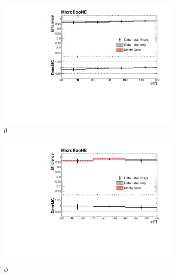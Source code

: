 \documentclass[a4paper,11pt]{article}
\begin{document}
\begin{figure}[htbp]
  \begin{center}
    \begin{subfigure}{0.61\textwidth}
      \includegraphics[width=\linewidth]{figures/theta.pdf}
      \caption{$\theta$} \label{fig:theta}
    \end{subfigure}
    \begin{subfigure}{0.61\textwidth}
      \includegraphics[width=\linewidth]{figures/phi.pdf}
      \caption{$\phi$} \label{fig:phi}
    \end{subfigure}
    \begin{subfigure}{0.61\textwidth}

\end{subfigure}
\end{center}
\end{figure}
\end{document}
